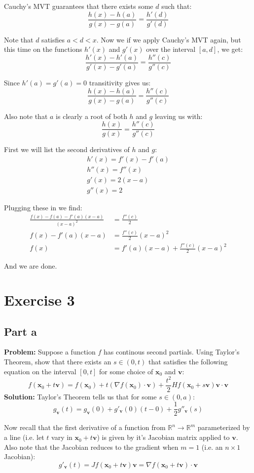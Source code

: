 \documentclass{article}
\begin{document}
Cauchy's MVT guarantees that there exists some $d$ such that:
$$\frac{h(x)-h(a)}{g(x)-g(a)}=\frac{h'(d)}{g'(d)}$$

Note that $d$ satisfies $a<d<x$. Now we if we apply Cauchy's MVT again, but this time on the functions $h'(x)$ and $g'(x)$ over the interval $[a,d]$, we get:
$$\frac{h'(x)-h'(a)}{g'(x)-g'(a)}=\frac{h''(c)}{g''(c)}$$

Since $h'(a)=g'(a)=0$ transitivity gives us:
$$\frac{h(x)-h(a)}{g(x)-g(a)}=\frac{h''(c)}{g''(c)}$$

Also note that $a$ is clearly a root of both $h$ and $g$ leaving us with:
$$\frac{h(x)}{g(x)}=\frac{h''(c)}{g''(c)}$$

First we will list the second derivatives of $h$ and $g$:
\begin{align*}
  h'(x)=f'(x)-f'(a)\\
  h''(x)=f''(x)\\
  g'(x)=2(x-a)\\
  g''(x)=2
\end{align*}

Plugging these in we find:
\begin{align*}
  \frac{f(x)-f(a)-f'(a)(x-a)}{(x-a)^2}&=\frac{f''(c)}{2}\\
  f(x)-f'(a)(x-a)&=\frac{f''(c)}{2}(x-a)^2\\
  f(x)&=f'(a)(x-a)+\frac{f''(c)}{2}(x-a)^2
\end{align*}

And we are done.

\section*{Exercise 3}
\subsection*{Part a}
\textbf{Problem:} Suppose a function $f$ has continous second partials. Using Taylor's Theorem, show that there exists an $s\in(0,t)$ that satisfies the following equation on the interval $[0,t]$ for some choice of $\mathbf x_0$ and $\mathbf v$:
$$f(\mathbf x_0+t\mathbf v)=f(\mathbf x_0)+t(\nabla f(\mathbf x_0)\cdot\mathbf v)+\frac{t^2}{2}Hf(\mathbf x_0+s\mathbf v)\mathbf v\cdot\mathbf v$$
\textbf{Solution:} Taylor's Theorem tells us that for some $s\in(0,a)$:
$$g_\mathbf v(t)=g_\mathbf v(0)+g'_\mathbf v(0)(t-0)+\frac{1}{2}g''_\mathbf v(s)$$

Now recall that the first derivative of a function from $\mathbb R^n\to\mathbb R^m$ parameterized by a line (i.e. let $t$ vary in $\mathbf x_0+t\mathbf v$) is given by it's Jacobian matrix applied to $\mathbf v$. Also note that the Jacobian reduces to the gradient when $m=1$ (i.e. an $n\times 1$ Jacobian):
$$g'_\mathbf v(t)=Jf(\mathbf x_0+t\mathbf v)\mathbf v=\nabla f(\mathbf x_0+t\mathbf v)\cdot\mathbf v$$
\end{document}
